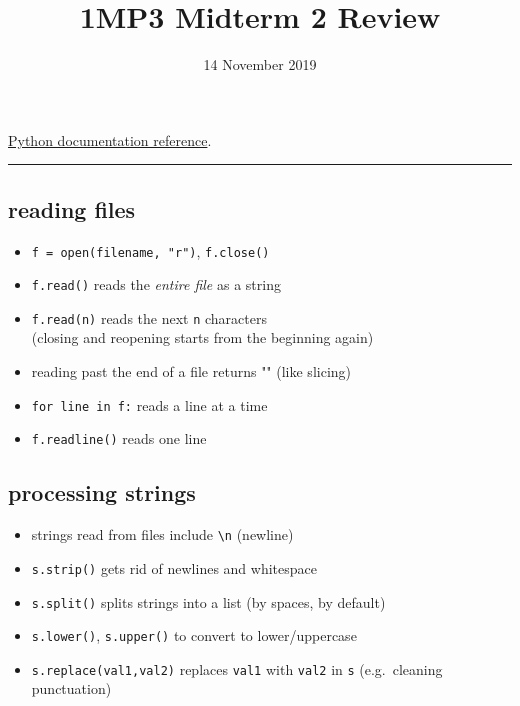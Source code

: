 \documentclass[]{tufte-handout}
\title{1MP3 Midterm 2 Review}
\date{14 November 2019}
\providecommand{\tightlist}{%
  \setlength{\itemsep}{0pt}\setlength{\parskip}{0pt}}
\begin{document}
\maketitle




\href{https://docs.python.org/3/tutorial}{Python documentation
reference}.

\begin{center}\rule{0.5\linewidth}{\linethickness}\end{center}

\hypertarget{reading-files}{%
\subsection{reading files}\label{reading-files}}

\begin{itemize}
\tightlist
\item
  \texttt{f\ =\ open(filename,\ "r")}, \texttt{f.close()}
\item
  \texttt{f.read()} reads the \emph{entire file} as a string
\item
  \texttt{f.read(n)} reads the next \texttt{n} characters\\
  (closing and reopening starts from the beginning again)
\item
  reading past the end of a file returns "" (like slicing)
\item
  \texttt{for\ line\ in\ f:} reads a line at a time
\item
  \texttt{f.readline()} reads one line
\end{itemize}

\hypertarget{processing-strings}{%
\subsection{processing strings}\label{processing-strings}}

\begin{itemize}
\tightlist
\item
  strings read from files include \texttt{\textbackslash{}n} (newline)
\item
  \texttt{s.strip()} gets rid of newlines and whitespace
\item
  \texttt{s.split()} splits strings into a list (by spaces, by default)
\item
  \texttt{s.lower()}, \texttt{s.upper()} to convert to lower/uppercase
\item
  \texttt{s.replace(val1,val2)} replaces \texttt{val1} with
  \texttt{val2} in \texttt{s} (e.g.~cleaning punctuation)
\end{itemize}
\end{document}
